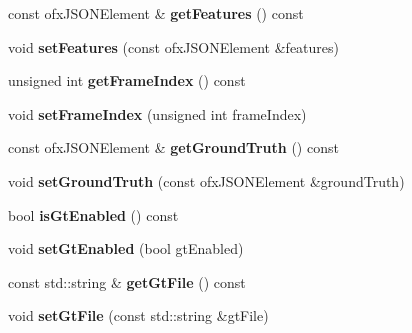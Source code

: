 \begin{DoxyCompactItemize}
\item 
const ofx\+J\+S\+O\+N\+Element \& {\bfseries get\+Features} () const \hypertarget{classPopulationManager_a35e0b3c1dbf718c23ac2132969d270aa}{}\label{classPopulationManager_a35e0b3c1dbf718c23ac2132969d270aa}

\item 
void {\bfseries set\+Features} (const ofx\+J\+S\+O\+N\+Element \&features)\hypertarget{classPopulationManager_ad0f56a78149c12e9327456f8f0264dcb}{}\label{classPopulationManager_ad0f56a78149c12e9327456f8f0264dcb}

\item 
unsigned int {\bfseries get\+Frame\+Index} () const \hypertarget{classPopulationManager_a29ac81f9b477aaeba57ccff9cbe35b48}{}\label{classPopulationManager_a29ac81f9b477aaeba57ccff9cbe35b48}

\item 
void {\bfseries set\+Frame\+Index} (unsigned int frame\+Index)\hypertarget{classPopulationManager_ab442ff6670f1d9ae312949c80c1d2024}{}\label{classPopulationManager_ab442ff6670f1d9ae312949c80c1d2024}

\item 
const ofx\+J\+S\+O\+N\+Element \& {\bfseries get\+Ground\+Truth} () const \hypertarget{classPopulationManager_a50ffc188c034c544f30f8dc47c7f0ed9}{}\label{classPopulationManager_a50ffc188c034c544f30f8dc47c7f0ed9}

\item 
void {\bfseries set\+Ground\+Truth} (const ofx\+J\+S\+O\+N\+Element \&ground\+Truth)\hypertarget{classPopulationManager_a082873088273ed995bdb939dbb1b6af2}{}\label{classPopulationManager_a082873088273ed995bdb939dbb1b6af2}

\item 
bool {\bfseries is\+Gt\+Enabled} () const \hypertarget{classPopulationManager_a7a65e0c78ae942f827d83fe4479ddc78}{}\label{classPopulationManager_a7a65e0c78ae942f827d83fe4479ddc78}

\item 
void {\bfseries set\+Gt\+Enabled} (bool gt\+Enabled)\hypertarget{classPopulationManager_a8ff05f80d5610a5bc4a48e9bafbcb6e0}{}\label{classPopulationManager_a8ff05f80d5610a5bc4a48e9bafbcb6e0}

\item 
const std\+::string \& {\bfseries get\+Gt\+File} () const \hypertarget{classPopulationManager_af92a989024c47451ad1a4af4d6fc3543}{}\label{classPopulationManager_af92a989024c47451ad1a4af4d6fc3543}

\item 
void {\bfseries set\+Gt\+File} (const std\+::string \&gt\+File)\hypertarget{classPopulationManager_a1bc7287c2b14b7895e93b0bcce66637e}{}\label{classPopulationManager_a1bc7287c2b14b7895e93b0bcce66637e}


\end{DoxyCompactItemize}
